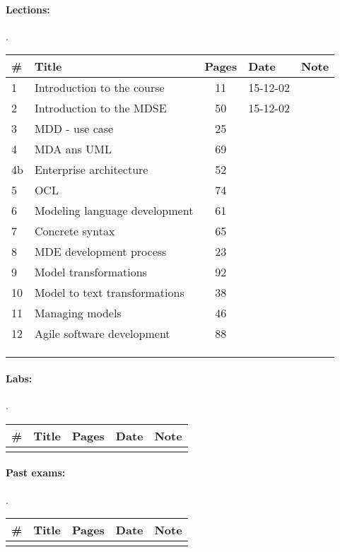 \documentclass[a4paper,12pt]{article} %
\begin{document}
\paragraph{Lections:} .\\
\begin{tabularx}{\textwidth}{|l|X|c|l|c|}
	\hline
	\# & Title & Pages & Date & Note \\
	\hline
	1 & Introduction to the course & 11 & 15-12-02 &  \\
	\hline
	2 & Introduction to the MDSE & 50 & 15-12-02 &  \\
	\hline
	3 & MDD - use case & 25 &  &  \\
	\hline
	4 & MDA ans UML & 69 &  &  \\
	\hline
	4b & Enterprise architecture & 52 &  &  \\
	\hline
	5 & OCL & 74 &  &  \\
	\hline
	6 & Modeling language development & 61 &  &  \\
	\hline
	7 & Concrete syntax & 65 &  &  \\
	\hline
	8 & MDE development process & 23 &  &  \\
	\hline
	9 & Model transformations & 92 &  &  \\
	\hline
	10 & Model to text transformations & 38 &  &  \\
	\hline
	11 & Managing models & 46 &  &  \\
	\hline
	12 & Agile software development & 88 &  &  \\
	\hline
	&  &  &  &  \\
	\hline
	&  &  &  &  \\
	\hline
	&  &  &  &  \\
	\hline
\end{tabularx}

\paragraph{Labs:}.\\
\begin{tabularx}{\textwidth}{|l|X|c|l|c|}
	\hline
	\# & Title & Pages & Date & Note \\
	\hline
	&  &  &  &  \\
	\hline
\end{tabularx}

\paragraph{Past exams:}.\\
\begin{tabularx}{\textwidth}{|l|X|c|l|c|}
	\hline
	\# & Title & Pages & Date & Note \\
	\hline
	&  &  &  &  \\
	\hline
\end{tabularx}
\end{document}
